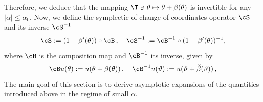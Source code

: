 \documentclass[a4paper,reqno,10pt]{article}
\begin{document}
Therefore, we deduce that the mapping $\T\ni \theta\mapsto \theta+\beta(\theta)$ is invertible for any $|\alpha| \leq  \alpha_{0}$.
Now, we  define the symplectic of change of coordinates  operator $\cS$  and  its inverse $\cS^{-1}$
\begin{equation}\label{S.diffeo}
	\cS := (1+ \beta'(\theta)) \circ \cB \,, \quad \cS^{-1} := \cB^{-1} \circ (1 + \beta'(\theta))^{-1},
\end{equation}
where $\cB$ is the
composition map and $\cB^{-1}$ its inverse, given by
\begin{equation}\label{B.diffeo}
	\cB u(\theta):= u(\theta + \beta(\theta)) \,, \quad \cB^{-1} u(\vartheta) := u(\vartheta+ \breve{\beta}(\vartheta))\,,
\end{equation}
The main goal of this section is to derive asymptotic expansions of the quantities introduced above in the regime of small $\alpha.$
			
\end{document}
